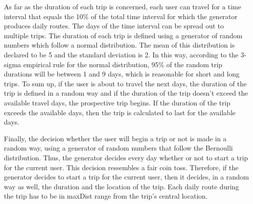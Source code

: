 As far as the duration of each trip is concerned, each user can travel for a time interval that equals the 10\% of the total time interval for which the generator 
produces daily routes. The days of the time interval can be spread out to multiple trips. The duration of each trip is defined using a generator of random numbers 
which follow a normal distribution. The mean of this distribution is declared to be 5 and the standard deviation is 2. In this way, according to the 
3-sigma empirical rule for the normal distribution, 95\% of the random trip durations will be between 1 and 9 days, which is reasonable for short and long trips. 
To sum up, if the user is about to travel the next days, the duration of the trip is defined in a random way and if the duration of the trip doesn't exceed the 
available travel days, the prospective trip begins. If the duration of the trip exceeds the available days, then the trip is calculated to last for the 
available days.

Finally, the decision whether the user will begin a trip or not is made in a random way, using a generator of random numbers that follow the Bernoulli distribution. 
Thus, the generator decides every day whether or not to start a trip for the current user. This decision ressembles a fair coin toss. Therefore, 
if the generator decides to start a trip for the current user, then it decides, in a random way as well, the duration and the location of the trip. Each 
daily route during the trip has to be in maxDist range from the trip's central location.









